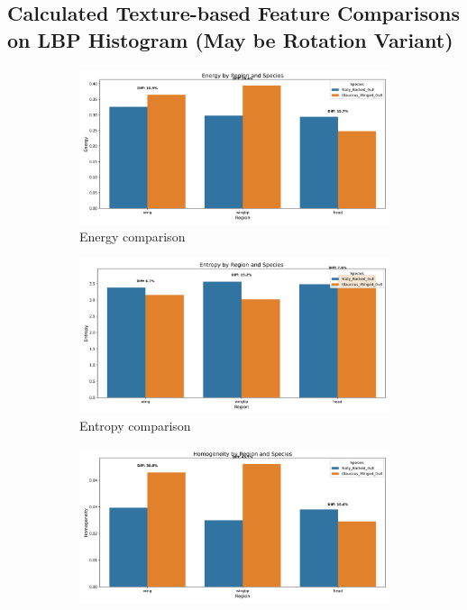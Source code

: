 \documentclass[a4paper,12pt]{report}
\begin{document}
\subsection{Calculated Texture-based Feature Comparisons on LBP Histogram (May be Rotation Variant)}
\begin{figure}[htbp]
    \centering
    \begin{subfigure}[b]{0.48\textwidth}
        \includegraphics[width=\textwidth]{images/appendix/Original/energy_comparison.png}
        \caption{Energy comparison}
    \end{subfigure}
    \hfill
    \begin{subfigure}[b]{0.48\textwidth}
        \includegraphics[width=\textwidth]{images/appendix/Original/entropy_comparison.png}
        \caption{Entropy comparison}
    \end{subfigure}
    \vspace{0.5cm}
    \begin{subfigure}[b]{0.48\textwidth}
        \includegraphics[width=\textwidth]{images/appendix/Original/homogeneity_comparison.png}

\end{subfigure}
\end{figure}
\end{document}
